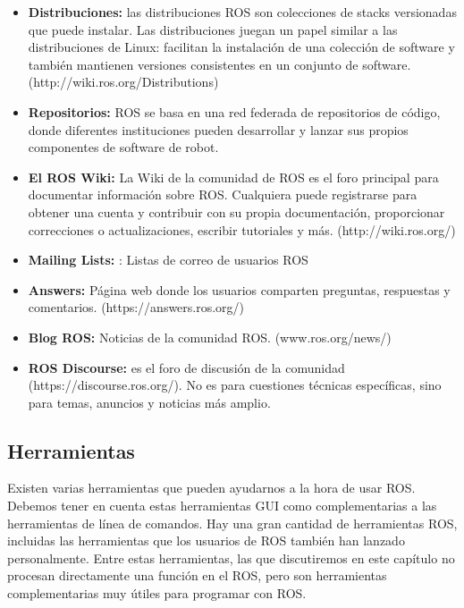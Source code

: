             \begin{itemize}
                \item {\textbf{Distribuciones:} las distribuciones ROS son colecciones de stacks versionadas que puede instalar. Las distribuciones juegan un papel similar a las distribuciones de Linux: facilitan la instalación de una colección de software y también mantienen versiones consistentes en un conjunto de software. (http://wiki.ros.org/Distributions)}
                \item {\textbf{Repositorios:} ROS se basa en una red federada de repositorios de código, donde diferentes instituciones pueden desarrollar y lanzar sus propios componentes de software de robot. }
                \item {\textbf{El ROS Wiki:} La Wiki de la comunidad de ROS es el foro principal para documentar información sobre ROS. Cualquiera puede registrarse para obtener una cuenta y contribuir con su propia documentación, proporcionar correcciones o actualizaciones, escribir tutoriales y más. (http://wiki.ros.org/) }
                \item {\textbf{Mailing Lists:} : Listas de correo de usuarios ROS}
                \item {\textbf{Answers:} Página web donde los usuarios comparten preguntas, respuestas y comentarios. (https://answers.ros.org/) }
                \item {\textbf{Blog ROS:} Noticias de la comunidad ROS. (www.ros.org/news/)  }
                \item {\textbf{ROS Discourse:} es el foro de discusión de la comunidad (https://discourse.ros.org/). No es para cuestiones técnicas específicas, sino para temas, anuncios y noticias más amplio.}
            \end{itemize}
            
            
            
            
               \newpage
               
    \newpage

    \subsection{Herramientas}
    
        Existen varias herramientas que pueden ayudarnos a la hora de usar ROS. Debemos tener en cuenta estas herramientas GUI como complementarias a las herramientas de línea de comandos. Hay una gran cantidad de herramientas ROS, incluidas las herramientas que los usuarios de ROS también han lanzado personalmente. Entre estas herramientas, las que discutiremos en este capítulo no procesan directamente una función en el ROS, pero son herramientas complementarias muy útiles para programar con ROS.
            
